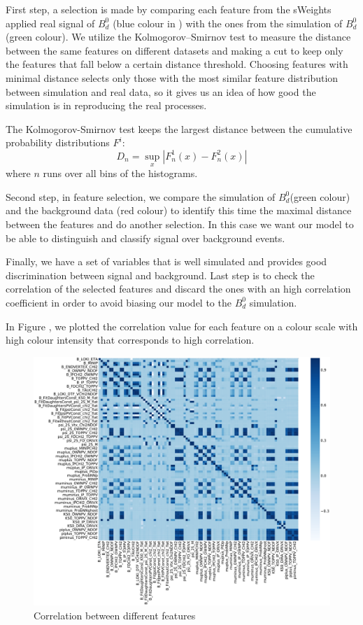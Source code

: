 First step, a selection is made by comparing each feature from the sWeights applied real signal of $B_{d}^{0}$ (blue colour in ) with the ones from the simulation of $B_{d}^{0}$ (green colour). We utilize the Kolmogorov–Smirnov test to measure the distance between the same features on different datasets and making a cut to keep only the features that fall below a certain distance threshold. Choosing features with minimal distance selects only those with the most similar feature distribution between simulation and real data, so it gives us an idea of how good the simulation is in reproducing the real processes.

The Kolmogorov-Smirnov test \cite{KS_test} keeps the largest distance between the cumulative probability distributions $F^i$:
\begin{equation}
    D_n = \sup_x\left|F_n^1(x)-F_n^2(x)\right|
\end{equation}
where $n$  runs over all bins of the histograms.

Second step, in feature selection, we compare the simulation of $B_{d}^{0}$(green colour) and the background data (red colour) to identify this time the maximal distance between the features and do another selection. In this case we want our model to be able to distinguish and classify signal over background events.

Finally, we have a set of variables that is well simulated and provides good discrimination between signal and background. Last step is to check the correlation of the selected features and discard the ones with an high correlation coefficient in order to avoid biasing our model to the $B_d^0$ simulation.

In Figure , we plotted the correlation value for each feature on a colour scale with high colour intensity that corresponds to high correlation.

\newpage
\begin{figure}[H]
    \centering
    \includegraphics[width=0.95\linewidth]{graphs/corr_big.pdf}
    \caption{Correlation between different features}
    \label{fig:corr}
\end{figure}

